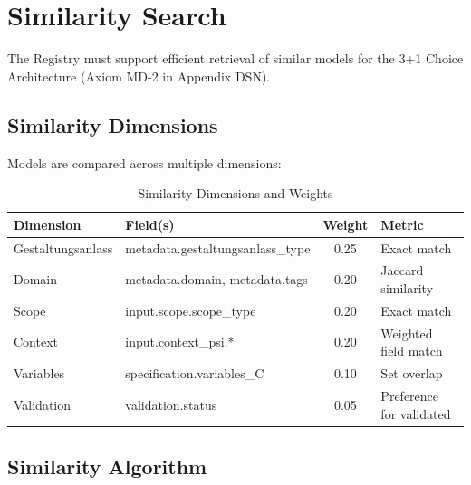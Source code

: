 \section{Similarity Search}
\label{sec:fff-similarity}

The Registry must support efficient retrieval of similar models for the 3+1
Choice Architecture (Axiom MD-2 in Appendix DSN).

\subsection{Similarity Dimensions}

Models are compared across multiple dimensions:

\begin{table}[htbp]
\centering
\caption{Similarity Dimensions and Weights}
\label{tab:fff-similarity}
\renewcommand{\arraystretch}{1.3}
\begin{tabular}{@{}llcl@{}}
\toprule
\textbf{Dimension} & \textbf{Field(s)} & \textbf{Weight} & \textbf{Metric} \\
\midrule
Gestaltungsanlass & metadata.gestaltungsanlass\_type & 0.25 & Exact match \\
Domain & metadata.domain, metadata.tags & 0.20 & Jaccard similarity \\
Scope & input.scope.scope\_type & 0.20 & Exact match \\
Context & input.context\_psi.* & 0.20 & Weighted field match \\
Variables & specification.variables\_C & 0.10 & Set overlap \\
Validation & validation.status & 0.05 & Preference for validated \\
\bottomrule
\end{tabular}
\end{table}

\subsection{Similarity Algorithm}

